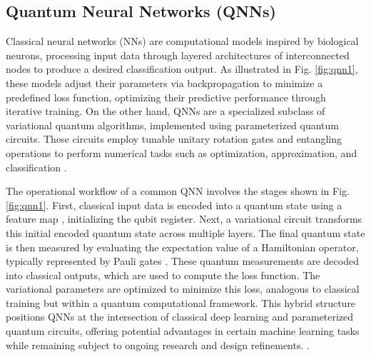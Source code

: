 \documentclass{article}
\begin{document}
\subsection*{Quantum Neural Networks (QNNs)}
Classical neural networks (NNs) are computational models inspired by biological neurons, processing input data through layered architectures of interconnected nodes to produce a desired classification output. As illustrated in Fig. \ref{fig:qnn1}, these models adjust their parameters via backpropagation to minimize a predefined loss function, optimizing their predictive performance through iterative training. On the other hand, QNNs are a specialized subclass of variational quantum algorithms, implemented using parameterized quantum circuits. These circuits employ tunable unitary rotation gates and entangling operations to perform numerical tasks such as optimization, approximation, and classification \cite{kwak2021quantumneuralnetworksconcepts}.

The operational workflow of a common QNN involves the stages shown in Fig. \ref{fig:qnn1}. First, classical input data is encoded into a quantum state using a feature map \cite{kwon2024featuremapquantumdata}, initializing the qubit register. Next, a variational circuit transforms this initial encoded quantum state across multiple layers. The final quantum state is then measured by evaluating the expectation value of a Hamiltonian operator, typically represented by Pauli gates \cite{farhi2018classificationquantumneuralnetworks}. These quantum measurements are decoded into classical outputs, which are used to compute the loss function. The variational parameters are optimized to minimize this loss, analogous to classical training but within a quantum computational framework. This hybrid structure positions QNNs at the intersection of classical deep learning and parameterized quantum circuits, offering potential advantages in certain machine learning tasks while remaining subject to ongoing research and design refinements. \cite{qiskittheory}.
\end{document}
